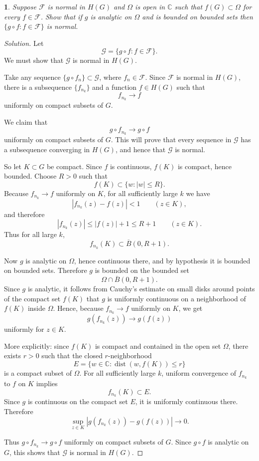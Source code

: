 \documentclass[12pt, a4paper]{report}
\theoremstyle{spaced}
\newtheorem{exercise}{}
\newcommand{\setexercise}[1]{\setcounter{exercise}{#1-1}}
\begin{document}
\setexercise{7}
\begin{exercise}
	Suppose $\mathcal{F}$ is normal in $H(G)$ and $\Omega$ is open in $\mathbb{C}$
	such that $f(G)\subset\Omega$ for every $f\in\mathcal{F}$. Show that if
	$g$ is analytic on $\Omega$ and is bounded on bounded sets then
	$\{g\circ f : f\in\mathcal{F}\}$ is normal.
\end{exercise}
\begin{proof}[Solution]
	Let
	\[
		\mathcal G=\{g\circ f:f\in\mathcal F\}.
	\]
	We must show that \(\mathcal G\) is normal in \(H(G)\).

	Take any sequence \(\{g\circ f_n\}\subset \mathcal G\), where \(f_n\in\mathcal F\). Since \(\mathcal F\) is normal in \(H(G)\), there is a subsequence \(\{f_{n_k}\}\) and a function \(f\in H(G)\) such that
	\[
		f_{n_k}\to f
	\]
	uniformly on compact subsets of \(G\).

	We claim that
	\[
		g\circ f_{n_k}\to g\circ f
	\]
	uniformly on compact subsets of \(G\). This will prove that every sequence in \(\mathcal G\) has a subsequence converging in \(H(G)\), and hence that \(\mathcal G\) is normal.

	So let \(K\subset G\) be compact. Since \(f\) is continuous, \(f(K)\) is compact, hence bounded. Choose \(R>0\) such that
	\[
		f(K)\subset \{w:|w|\le R\}.
	\]
	Because \(f_{n_k}\to f\) uniformly on \(K\), for all sufficiently large \(k\) we have
	\[
		|f_{n_k}(z)-f(z)|<1 \qquad (z\in K),
	\]
	and therefore
	\[
		|f_{n_k}(z)|\le |f(z)|+1\le R+1 \qquad (z\in K).
	\]
	Thus for all large \(k\),
	\[
		f_{n_k}(K)\subset \overline{B}(0,R+1).
	\]

	Now \(g\) is analytic on \(\Omega\), hence continuous there, and by hypothesis it is bounded on bounded sets. Therefore \(g\) is bounded on the bounded set
	\[
		\Omega\cap \overline{B}(0,R+1).
	\]
	Since \(g\) is analytic, it follows from Cauchy's estimate on small disks around points of the compact set \(f(K)\) that \(g\) is uniformly continuous on a neighborhood of \(f(K)\) inside \(\Omega\). Hence, because \(f_{n_k}\to f\) uniformly on \(K\), we get
	\[
		g(f_{n_k}(z))\to g(f(z))
	\]
	uniformly for \(z\in K\).

	More explicitly: since \(f(K)\) is compact and contained in the open set \(\Omega\), there exists \(r>0\) such that the closed \(r\)-neighborhood
	\[
		E=\{w\in\mathbb C:\operatorname{dist}(w,f(K))\le r\}
	\]
	is a compact subset of \(\Omega\). For all sufficiently large \(k\), uniform convergence of \(f_{n_k}\) to \(f\) on \(K\) implies
	\[
		f_{n_k}(K)\subset E.
	\]
	Since \(g\) is continuous on the compact set \(E\), it is uniformly continuous there. Therefore
	\[
		\sup_{z\in K}|g(f_{n_k}(z))-g(f(z))|\to 0.
	\]

	Thus \(g\circ f_{n_k}\to g\circ f\) uniformly on compact subsets of \(G\). Since \(g\circ f\) is analytic on \(G\), this shows that \(\mathcal G\) is normal in \(H(G)\).
\end{proof}
\end{document}
